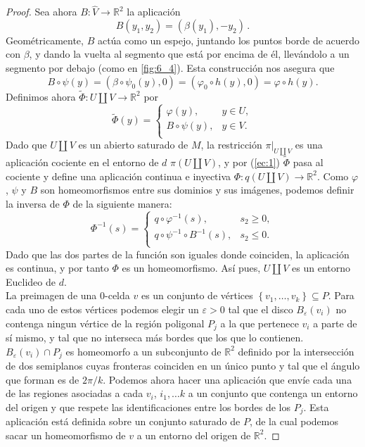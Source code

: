 \documentclass[10pt]{report}
\newcommand{\R}{\mathbb{R}}
\theoremstyle{definition}
\begin{document}
\begin{proof}
Sea ahora $B:\widehat{V}\to \R^2$ la aplicación $$B(y_1,y_2)=\left(\beta (y_1), -y_2\right)\, .$$
Geométricamente, $B$ actúa como un espejo, juntando los puntos borde de acuerdo con $\beta$, y dando la vuelta al segmento que está por encima de él, llevándolo a un segmento por debajo (como en \autoref{fig:6_4}). Esta construcción nos asegura que 
\begin{equation}\label{ec:1}
B\circ \psi(y)=\left(\beta \circ \psi_0(y),0\right)=\left(\varphi_0 \circ h(y),0\right)=\varphi \circ h(y).
\end{equation}
Definimos ahora $\tilde{\Phi}:U\amalg V\to \R^2$ por $$\tilde{\Phi}(y)=\begin{cases}
\varphi(y), & y\in U,\\
B\circ \psi (y), & y\in V.\\
\end{cases}$$
Dado que $U\amalg V$ es un abierto saturado de $M$, la restricción $\pi|_{U\amalg V}$ es una aplicación cociente en el entorno de $d$ $\pi (U\amalg V)$, y por (\ref{ec:1}) $\tilde{\Phi}$ pasa al cociente y define una aplicación continua e inyectiva $\Phi :q(U\amalg V)\to \R^2$. Como $\varphi$, $\psi$ y $B$ son homeomorfismos entre sus dominios y sus imágenes, podemos definir la inversa de $\Phi$ de la siguiente manera:
$$\Phi ^{-1}(s)= \begin{cases} 
q\circ \varphi ^{-1}(s), & s_2\geq 0, \\
q\circ \psi ^{-1} \circ B^{-1}(s), & s_2\leq 0.\\
 \end{cases}$$
Dado que las dos partes de la función son iguales donde coinciden, la aplicación es continua, y por tanto $\Phi$ es un homeomorfismo. Así pues, $U\amalg V$ es un entorno Euclideo de $d$.\\
La preimagen de una 0-celda $v$ es un conjunto de vértices $\left\{v_1,\dots ,v_k\right\} \subseteq P$. Para cada uno de estos vértices podemos elegir un $\varepsilon>0$ tal que el disco $B_{\varepsilon}(v_i)$ no contenga ningun vértice de la región poligonal $P_j$ a la que pertenece $v_i$ a parte de sí mismo, y tal que no interseca más bordes que los que lo contienen. $B_{\varepsilon}(v_i)\cap P_j$ es homeomorfo a un subconjunto de $\R^2$ definido por la intersección de dos semiplanos cuyas fronteras coinciden en un único punto y tal que el ángulo que forman es de $2\pi /k$. Podemos ahora hacer una aplicación que envíe cada una de las regiones asociadas a cada $v_i$, $i_1,\dots k$ a un conjunto que contenga un entorno del origen y que respete las identificaciones entre los bordes de los $P_j$. Esta aplicación está definida sobre un conjunto saturado de $P$, de la cual podemos sacar un homeomorfismo de $v$ a un entorno del origen de $\R^2$.

\end{proof}
\end{document}
